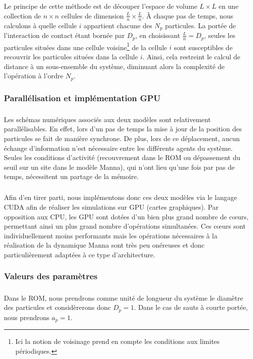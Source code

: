 \subparagraph{}Le principe de cette méthode est de découper l'espace de volume $L\times L$ en une collection de $ n \times n $ cellules de dimension $\frac{L}{n}\times \frac{L}{n}$. \`A chaque pas de temps, nous calculons à quelle cellule $i$ appartient chacune des $N_p$ particules. La portée de l'interaction de contact étant bornée par $D_p$, en choisissant $\frac{L}{n}=D_p$, seules les particules situées dans une cellule voisine\footnote{Ici la notion de voisinage prend en compte les conditions aux limites périodiques.} de la cellule $i$ sont susceptibles de recouvrir les particules situées dans la cellule $i$. Ainsi, cela restreint le calcul de distance à un sous-ensemble du système, diminuant alors la complexité de l'opération à l'ordre $N_p$.

\subsubsection{Parallélisation et implémentation GPU}

\subparagraph{}Les schémas numériques associés aux deux modèles sont relativement parallélisables. En effet, lors d'un pas de temps la mise à jour de la position des particules se fait de manière synchrone. De plus, lors de ce déplacement, aucun échange d'information n'est nécessaire entre les différents agents du système. Seules les conditions d'activité (recouvrement dans le ROM ou dépassement du seuil sur un site dans le modèle Manna), qui n'ont lieu qu'une fois par pas de temps, nécessitent un partage de la mémoire. 

\subparagraph{}Afin d'en tirer parti, nous implémentons donc ces deux modèles via le langage CUDA \cite{cuda} afin de réaliser les simulations sur GPU (cartes graphiques). Par opposition aux CPU, les GPU sont dotées d'un bien plus grand nombre de cœurs, permettant ainsi un plus grand nombre d'opérations simultanées. Ces cœurs sont individuellement moins performants mais les opérations nécessaires à la réalisation de la dynamique Manna sont très peu onéreuses et donc particulièrement adaptées à ce type d'architecture.

\subsubsection{Valeurs des paramètres}

\subparagraph{}Dans le ROM, nous prendrons comme unité de longueur du système le diamètre des particules et considèrerons donc $D_p=1$. Dans le cas de sauts à courte portée, nous prendrons $a_p=1$.

